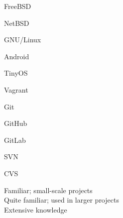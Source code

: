 \documentclass[a4paper,10pt]{article}
\begin{document}
\begin{itemize}
\begin{multicols}{3}
  \item FreeBSD   \hfill \twonotes
  \item NetBSD    \hfill \twonotes
  \item GNU/Linux \hfill \threenotes
  \item Android   \hfill \twonotes
  \item TinyOS    \hfill \onenote
\end{multicols}

\begin{multicols}{3}
  \item Vagrant \hfill \twonotes
  \item Git     \hfill \twonotes
  \item GitHub  \hfill \twonotes
  \item GitLab  \hfill \twonotes
  \item SVN     \hfill \onenote
  \item CVS     \hfill \onenote
\end{multicols}


\end{itemize}

\vspace{1em}

\begin{center}
\parbox[c]{8cm}{
  \onenote Familiar; small-scale projects \\
  \twonotes Quite familiar; used in larger projects \\
  \threenotes Extensive knowledge
}
\end{center}
\end{document}

